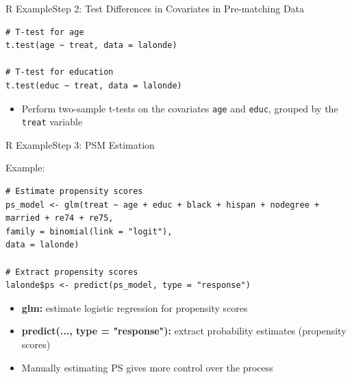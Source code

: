 \documentclass[hyperref={pdfpagelabels=false}]{beamer}
\begin{document}
\begin{frame}[fragile]{R Example}{Step 2: Test Differences in Covariates in Pre-matching Data}
\begin{lstlisting}
# T-test for age
t.test(age ~ treat, data = lalonde)

# T-test for education
t.test(educ ~ treat, data = lalonde)
\end{lstlisting}
	\begin{itemize}
		\vspace{0.2cm}
		\item Perform two-sample t-tests on the covariates \texttt{age} and \texttt{educ}, grouped by the \texttt{treat} variable
	
	\end{itemize}
\end{frame}


\begin{frame}[fragile]{R Example}{Step 3: PSM Estimation}
	\item Example:
\begin{lstlisting}
# Estimate propensity scores
ps_model <- glm(treat ~ age + educ + black + hispan + nodegree + married + re74 + re75, 
family = binomial(link = "logit"), 
data = lalonde)

# Extract propensity scores
lalonde$ps <- predict(ps_model, type = "response")
\end{lstlisting}
	\begin{itemize}
		\vspace{0.2cm}
		\item \textbf{glm:} estimate logistic regression for propensity scores
		\vspace{0.2cm}
		\item \textbf{predict(..., type = "response"):} extract probability estimates (propensity scores)
		\vspace{0.2cm}
		\item Manually estimating PS gives more control over the process
	\end{itemize}
\end{frame}
\end{document}
